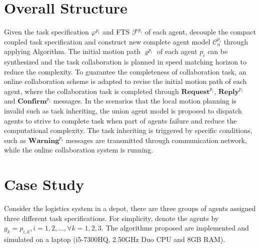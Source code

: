 \documentclass[journal]{IEEEtran}
\begin{document}
\section{Overall Structure}
Given the task specification $\varphi^{p_i}$ and FTS $\mathcal{F}^{p_i}$ of each agent, decouple the compact coupled task specification and construct new complete agent model $\mathcal{C}^{p_i}_n$ through applying Algorithm. The initial motion path $\varrho^{p_i}$ of each agent $p_i$ can be synthesized and the task collaboration is planned in speed matching horizon to reduce the complexity. To guarantee the completeness of collaboration task, an online collaboration scheme is adapted to revise the initial motion path of each agent, where the collaboration task is completed through $\textbf{Request}^{p_i}$, $\textbf{Reply}^{p_i}$ and $\textbf{Confirm}^{p_i}$ messages. In the scenarios that the local motion planning is invalid such as task inheriting, the union agent model is proposed to dispatch agents to strive to complete task when part of agents failure and reduce the computational complexity. The task inheriting is triggered by specific conditions, such as $\textbf{Warning}^{p_i}$ messages are transmitted through communication network, while the online collaboration system is running.
\section{Case Study}
Consider the logistics system in a depot, there are three groups of agents assigned three different task specifications. For simplicity, denote the agents by $g_k={p_{i,k},i=1,2,...},\forall k=1,2,3$. The algorithms proposed are implemented and simulated on a laptop (i5-7300HQ, 2.50GHz Duo CPU and 8GB RAM).
\end{document}
